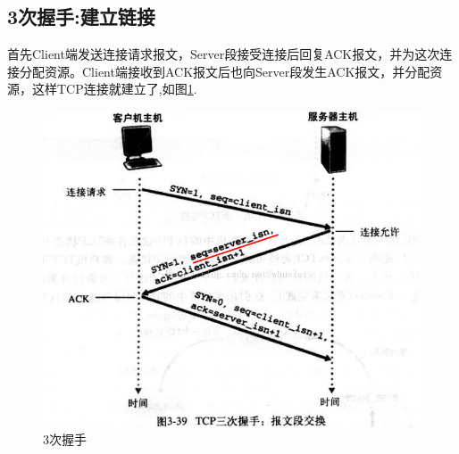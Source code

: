 \documentclass[UTF8,a4paper,8pt]{ctexbook}
\begin{document}
		\newpage
		\subsection{3次握手:建立链接}
			首先Client端发送连接请求报文，Server段接受连接后回复ACK报文，并为这次连接分配资源。Client端接收到ACK报文后也向Server段发生ACK报文，并分配资源，这样TCP连接就建立了,如图\ref{3times}.
			
			\begin{figure}[ht]
				\centering
				\includegraphics[scale = 0.5]{TCP-3times.png}
				\caption{3次握手}
				\label{3times}
			\end{figure}
			
\end{document}
